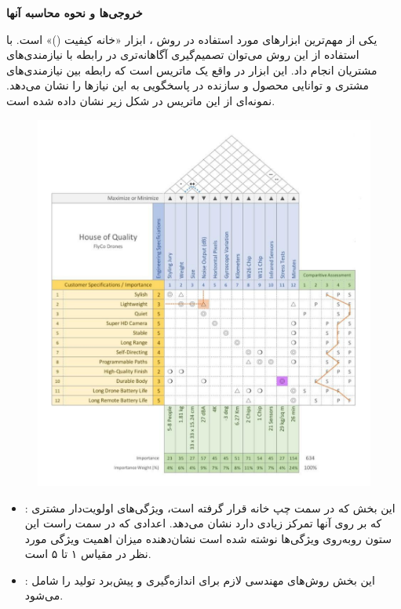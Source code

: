 {\begin{enumerate}[a)]
\textbf{خروجی‌ها و نحوه محاسبه آنها}

یکی از مهم‌ترین ابزارهای مورد استفاده در روش ، ابزار «خانه کیفیت ()» است. با استفاده از این روش می‌توان تصمیم‌گیری آگاهانه‌تری در رابطه با نیازمندی‌های مشتریان انجام داد. این ابزار در واقع یک ماتریس است که رابطه بین نیازمندی‌های مشتری و توانایی محصول و سازنده در پاسخگویی به این نیازها را نشان می‌دهد. نمونه‌ای از این ماتریس در شکل زیر نشان‌ داده شده است.

\begin{figure}[h]
	\centering
	\includegraphics[scale=1]{figs/2-1}
\end{figure}

\begin{itemize}
\item
{}: این بخش که در سمت چپ خانه قرار گرفته است، ویژگی‌های اولویت‌دار مشتری که بر روی آنها تمرکز زیادی دارد نشان می‌دهد. اعدادی که در سمت راست این ستون روبه‌روی ویژگی‌ها نوشته شده است نشان‌دهنده میزان اهمیت ویژگی مورد نظر در مقیاس ۱ تا ۵ است.

\item
{}: این بخش روش‌های مهندسی لازم برای اندازه‌گیری و پیش‌برد تولید را شامل می‌شود. 


\end{itemize}
\end{enumerate}}
